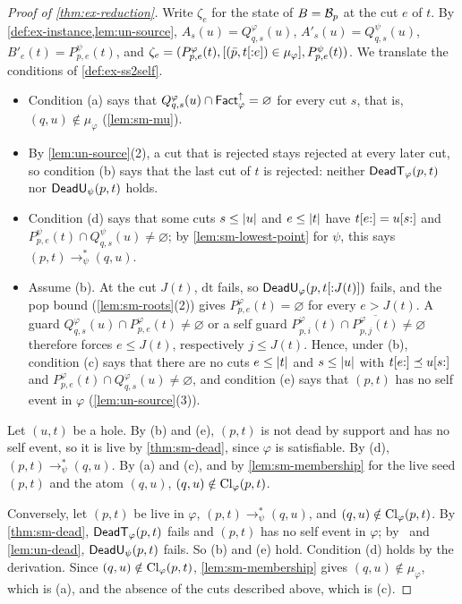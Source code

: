 \begin{proof}[Proof of \cref{thm:ex-reduction}]
Write $\zeta_e$ for the state of $B=\mathcal B_p$ at the cut $e$ of $t$. By
\cref{def:ex-instance,lem:un-source}, $A_s(u)=Q^\varphi_{q,s}(u)$,
$A'_s(u)=Q^\psi_{q,s}(u)$, $B'_e(t)=P^\psi_{p,e}(t)$, and
$\zeta_e=(P^\varphi_{p,e}(t),[(\bar p,t[{:}e])\in\mu_\varphi],P^\psi_{p,e}(t))$.
We translate the conditions of \cref{def:ex-ss2self}.
\begin{itemize}[leftmargin=*]
\item Condition (a) says that $Q^\varphi_{q,s}(u)\cap\mathsf{Fact}^{\uparrow}_{\varphi}=\varnothing$
  for every cut $s$, that is, $(q,u)\notin\mu_\varphi$ (\cref{lem:sm-mu}).
\item By \cref{lem:un-source}(2), a cut that is rejected stays rejected at
  every later cut, so condition (b) says that the last cut of $t$ is rejected:
  neither $\mathsf{DeadT}_\varphi(p,t)$ nor $\mathsf{DeadU}_\psi(p,t)$ holds.
\item Condition (d) says that some cuts $s\le\lvert u\rvert$ and $e\le\lvert t\rvert$ have
  $t[e{:}]=u[s{:}]$ and $P^\psi_{p,e}(t)\cap Q^\psi_{q,s}(u)\ne\varnothing$;
  by \cref{lem:sm-lowest-point} for $\psi$, this says $(p,t)\to^*_\psi(q,u)$.
\item Assume (b). At the cut $J(t)$, $\mathrm{dt}$ fails, so
  $\mathsf{DeadU}_\varphi(p,t[{:}J(t)])$ fails, and the pop bound (\cref{lem:sm-roots}(2))
  gives $P^\varphi_{p,e}(t)=\varnothing$ for every $e>J(t)$. A guard
  $Q^\varphi_{q,s}(u)\cap P^\varphi_{p,e}(t)\ne\varnothing$ or a self guard
  $P^\varphi_{p,i}(t)\cap\overline{P^\varphi_{p,j}(t)}\ne\varnothing$ therefore
  forces $e\le J(t)$, respectively $j\le J(t)$. Hence, under (b), condition (c)
  says that there are no cuts $e\le\lvert t\rvert$ and $s\le\lvert u\rvert$ with
  $t[e{:}]\preceq u[s{:}]$ and
  $P^\varphi_{p,e}(t)\cap Q^\varphi_{q,s}(u)\ne\varnothing$, and condition (e)
  says that $(p,t)$ has no self event in $\varphi$
  (\cref{lem:un-source}(3)).
\end{itemize}

Let $(u,t)$ be a hole. By (b) and (e), $(p,t)$ is not dead by support and has no
self event, so it is live by \cref{thm:sm-dead}, since $\varphi$ is
satisfiable. By (d), $(p,t)\to^*_\psi(q,u)$. By (a) and (c), and by
\cref{lem:sm-membership} for the live seed $(p,t)$ and the atom $(q,u)$,
$(q,u)\notin\operatorname{Cl}_\varphi(p,t)$.

Conversely, let $(p,t)$ be live in $\varphi$, $(p,t)\to^*_\psi(q,u)$, and
$(q,u)\notin\operatorname{Cl}_\varphi(p,t)$. By \cref{thm:sm-dead}, $\mathsf{DeadT}_\varphi(p,t)$
fails and $(p,t)$ has no self event in $\varphi$; by \CondU\ and
\cref{lem:un-dead}, $\mathsf{DeadU}_\psi(p,t)$ fails. So (b) and (e) hold. Condition
(d) holds by the derivation. Since $(q,u)\notin\operatorname{Cl}_\varphi(p,t)$,
\cref{lem:sm-membership} gives $(q,u)\notin\mu_\varphi$, which is (a), and the
absence of the cuts described above, which is (c).


\end{proof}
